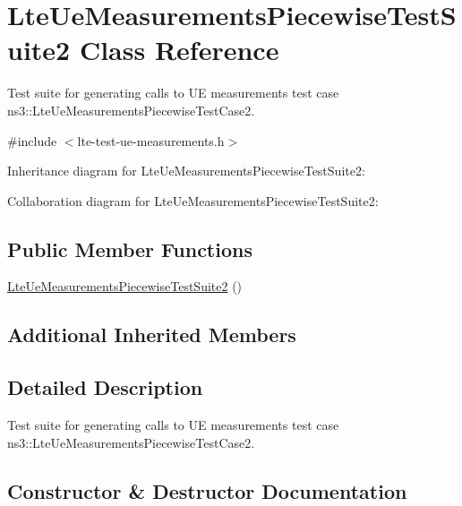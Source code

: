 \hypertarget{classLteUeMeasurementsPiecewiseTestSuite2}{}\section{Lte\+Ue\+Measurements\+Piecewise\+Test\+Suite2 Class Reference}
\label{classLteUeMeasurementsPiecewiseTestSuite2}


Test suite for generating calls to UE measurements test case ns3\+::\+Lte\+Ue\+Measurements\+Piecewise\+Test\+Case2.  




{\ttfamily \#include $<$lte-\/test-\/ue-\/measurements.\+h$>$}



Inheritance diagram for Lte\+Ue\+Measurements\+Piecewise\+Test\+Suite2\+:


Collaboration diagram for Lte\+Ue\+Measurements\+Piecewise\+Test\+Suite2\+:
\subsection*{Public Member Functions}
\begin{DoxyCompactItemize}
\item 
\hyperlink{classLteUeMeasurementsPiecewiseTestSuite2_a21bc4c093f462de42c1856cd5385280a}{Lte\+Ue\+Measurements\+Piecewise\+Test\+Suite2} ()
\end{DoxyCompactItemize}
\subsection*{Additional Inherited Members}


\subsection{Detailed Description}
Test suite for generating calls to UE measurements test case ns3\+::\+Lte\+Ue\+Measurements\+Piecewise\+Test\+Case2. 

\subsection{Constructor \& Destructor Documentation}
